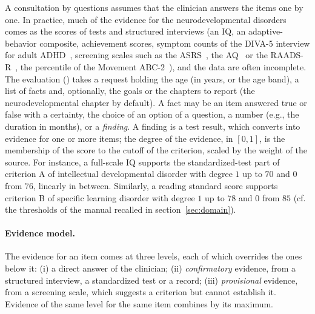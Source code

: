 A consultation by questions assumes that the clinician answers the items one by
one. In practice, much of the evidence for the neurodevelopmental disorders
comes as the scores of tests and structured interviews (an IQ, an
adaptive-behavior composite, achievement scores, symptom counts of the DIVA-5
interview for adult ADHD~\cite{kooij}, screening scales such as the
ASRS~\cite{asrs}, the AQ~\cite{aq} or the RAADS-R~\cite{raads}, the percentile
of the Movement ABC-2~\cite{mabc}), and the data are often incomplete. The
evaluation () takes a request holding the age (in years, or
the age band), a list of facts and, optionally, the goals or the chapters to
report (the neurodevelopmental chapter by default). A fact may be an item
answered true or false with a certainty, the choice of an option of a question,
a number (e.g., the duration in months), or a \emph{finding}. A finding is a
test result, which  converts into evidence for one or more
items; the degree of the evidence, in $[0,1]$, is the membership of the score
to the cutoff of the criterion, scaled by the weight of the source. For
instance, a full-scale IQ supports the standardized-test part of criterion A of
intellectual developmental disorder with degree $1$ up to $70$ and $0$ from
$76$, linearly in between. Similarly, a reading standard score supports
criterion B of specific learning disorder with degree $1$ up to $78$ and $0$
from $85$ (cf. the thresholds of the manual recalled in
section~\ref{sec:domain}).

\paragraph{Evidence model.}
The evidence for an item comes at three levels, each of which overrides the
ones below it: (i) a direct answer of the clinician; (ii) \emph{confirmatory}
evidence, from a structured interview, a standardized test or a record; (iii)
\emph{provisional} evidence, from a screening scale, which suggests a criterion
but cannot establish it. Evidence of the same level for the same item combines
by its maximum.

